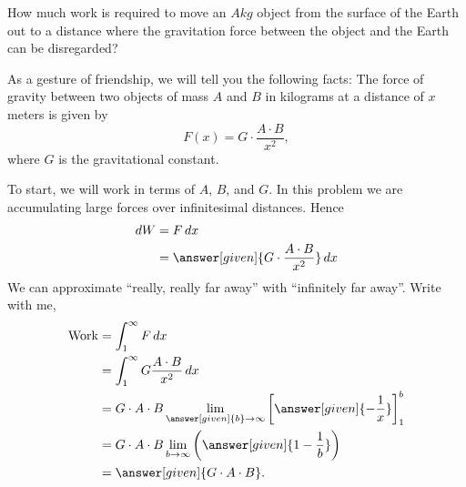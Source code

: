 \documentclass{ximera}
\begin{document}
\begin{example}
  How much work is required to move an $A\unit{kg}$ object from the
  surface of the Earth out to a distance where the gravitation force
  between the object and the Earth can be disregarded?

  As a gesture of friendship, we will tell you the following facts:
  The force of gravity between two objects of mass $A$ and $B$ in
  kilograms at a distance of $x$ meters is given by
  \[
  F(x) = G\cdot \frac{A\cdot B}{x^2},
  \]
  where $G$ is the gravitational constant. 
  \begin{explanation}
    To start, we will work in terms of $A$, $B$, and $G$. In this
    problem we are accumulating large forces over infinitesimal
    distances. Hence
    \begin{align*}
      \d W &= F \d x\\
      &= \answer[given]{G\cdot \frac{A\cdot B}{x^2}} \d x
    \end{align*}
    We can approximate ``really, really far away'' with ``infinitely
    far away''. Write with me,
    \begin{align*}
      \mathrm{Work} &= \int_1^\infty F \d x\\
      &= \int_1^\infty G\frac{A\cdot B}{x^2} \d x\\
      &= G\cdot A\cdot B \lim_{\answer[given]{b} \to \infty} \eval{\answer[given]{-\frac{1}{x}}}_1^b\\
      &=G\cdot A\cdot B \lim_{b \to \infty} \left(\answer[given]{1 - \frac{1}{b}}\right)\\
      &=\answer[given]{G\cdot A\cdot B}.
    \end{align*}
  \end{explanation}
\end{example}
\end{document}
